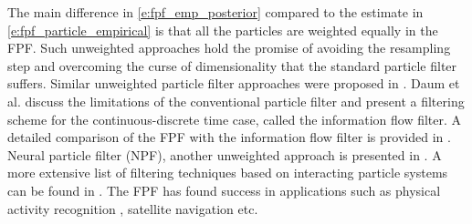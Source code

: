 The main difference in \eqref{e:fpf_emp_posterior} compared to the estimate in \eqref{e:fpf_particle_empirical} is that all the particles are weighted equally in the FPF. Such unweighted approaches hold the promise of avoiding the resampling step and overcoming the curse of dimensionality that the standard particle filter suffers. Similar unweighted particle filter approaches were proposed in \cite{mitnew04,crixio05}. Daum et al. discuss the limitations of the conventional particle filter and present a filtering scheme for the continuous-discrete time case, called the information flow filter. A detailed comparison of the FPF with the information flow filter is provided in \cite{taoyang_acc14}. Neural particle filter (NPF), another unweighted approach is presented in \cite{kutsursprpfi17}. A more extensive list of filtering techniques based on interacting particle systems can be found in \cite{yanlaumehmey16}. The FPF has found success in applications such as physical activity recognition \cite{tilhsimeh12, tilmehmey12a},  satellite navigation \cite{bergro16, berntorp15} etc. 

